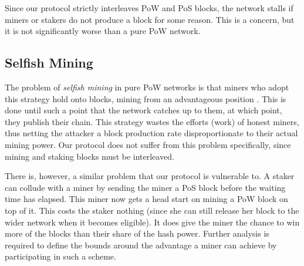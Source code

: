 Since our protocol strictly interleaves PoW and PoS blocks, the network stalls if miners or stakers do not produce a block for some reason. This is a concern, but it is not significantly worse than a pure PoW network. 

\subsection{Selfish Mining}

The problem of \textit{selfish mining} in pure PoW networks is that miners who adopt this strategy hold onto blocks, mining from an advantageous position \cite{selfish_mining}. This is done until such a point that the network catches up to them, at which point, they publish their chain. This strategy wastes the efforts (work) of honest miners, thus netting the attacker a block production rate disproportionate to their actual mining power. Our protocol does not suffer from this problem specifically, since mining and staking blocks must be interleaved.

There is, however, a similar problem that our protocol is vulnerable to. A staker can collude with a miner by sending the miner a PoS block before the waiting time has elapsed. This miner now gets a head start on mining a PoW block on top of it. This costs the staker nothing (since she can still release her block to the wider network when it becomes eligible). It does give the miner the chance to win more of the blocks than their share of the hash power. Further analysis is required to define the bounds around the advantage a miner can achieve by participating in such a scheme.  

